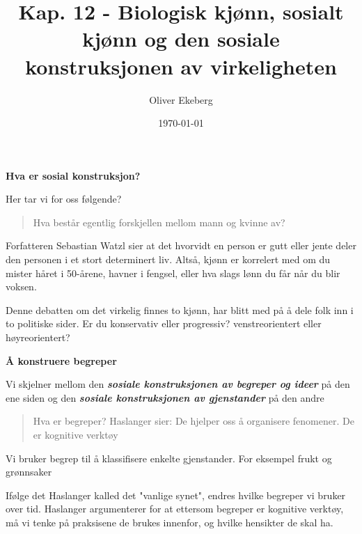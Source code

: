 \documentclass[11pt, a4paper]{article}
\title{Kap. 12 - Biologisk kjønn, sosialt kjønn og den sosiale konstruksjonen av virkeligheten}
\author{Oliver Ekeberg}
\date{\today}
\newenvironment{sectionbox}[1][]{%
    \begin{sectionboxinner}
    \textbf{\large #1}
    \vspace{1pt}
    \newline
}{%
    \end{sectionboxinner}
}
\begin{document}
\maketitle

\tableofcontents


\begin{sectionbox}[Hva er sosial konstruksjon?]
Her tar vi for oss følgende?
\begin{quote}
    Hva består egentlig forskjellen mellom mann og kvinne av?
\end{quote}

Forfatteren Sebastian Watzl sier at det hvorvidt en person er gutt eller jente deler den personen i et stort determinert liv. Altså, kjønn er korrelert med om du mister håret i 50-årene, havner i fengsel, eller hva slags lønn du får når du blir voksen.

Denne debatten om det virkelig finnes to kjønn, har blitt med på å dele folk inn i to politiske sider. Er du konservativ eller progressiv? venstreorientert eller høyreorientert? 

\end{sectionbox}

\begin{sectionbox}[Å konstruere begreper]
\begin{flushleft}
    Vi skjelner mellom den \textbf{\textit{sosiale konstruksjonen av begreper og ideer}} på den ene siden og den \textbf{\textit{sosiale konstruksjonen av gjenstander}} på den andre\\

    \begin{quote}
        Hva er begreper? Haslanger sier: De hjelper oss å organisere fenomener. De er kognitive verktøy
    \end{quote}

    Vi bruker begrep til å klassifisere enkelte gjenstander. For eksempel frukt og grønnsaker

    Ifølge det Haslanger kalled det "vanlige synet", endres hvilke begreper vi bruker over tid. Haslanger argumenterer for at ettersom begreper er kognitive verktøy, må vi tenke på praksisene de brukes innenfor, og hvilke hensikter de skal ha. 
\end{flushleft}
\end{sectionbox}
\end{document}
